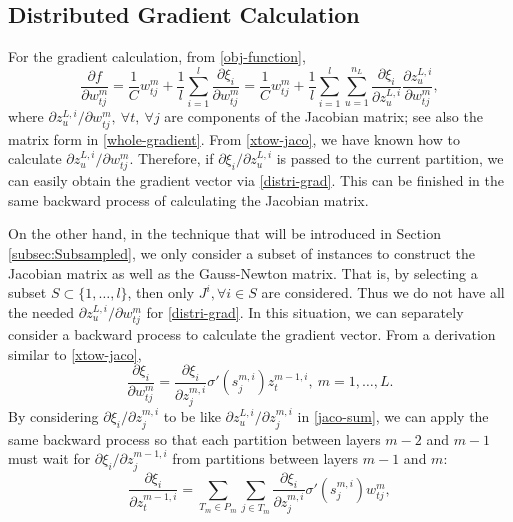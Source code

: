 \documentclass[12pt]{article}
\begin{document}
\subsection{Distributed Gradient Calculation}
\label{subsec:distri-gradient}
For the gradient calculation, from \eqref{obj-function}, 
\begin{equation}
\label{distri-grad}
\frac{\partial f}{\partial w^m_{tj}}
=\frac{1}{C} w^m_{tj} + \frac{1}{l} \sum_{i=1}^l \frac{\partial \xi_i}{\partial w^m_{tj}}
=\frac{1}{C} w^m_{tj} + \frac{1}{l} \sum_{i=1}^l \sum_{u=1}^{n_L} \frac{\partial \xi_i}{\partial z^{L,i}_u} \frac{\partial z^{L,i}_u}{\partial w^m_{tj}},
\end{equation}
where $\partial z^{L,i}_u/\partial w^m_{tj},\ \forall t,\ \forall j$ are components of the Jacobian matrix; see also the matrix form in \eqref{whole-gradient}.
From \eqref{xtow-jaco}, we have known how to calculate $\partial z^{L,i}_u/\partial w^m_{tj}$. Therefore, if $\partial \xi_i / \partial z^{L,i}_u$ is passed
to the current partition, we can easily obtain the gradient vector via \eqref{distri-grad}. This can be finished in the same backward process of calculating the Jacobian matrix.
\par On the other hand, in the technique that will be introduced in Section \ref{subsec:Subsampled}, we only consider a subset of instances to construct the Jacobian matrix as well as
the Gauss-Newton matrix. That is, by selecting a subset $S \subset \{1, \ldots,l\}$, then only $J^i, \forall i \in S$ are considered. 
Thus we do not have all the needed $\partial z^{L,i}_u/\partial w^m_{tj}$ for \eqref{distri-grad}. 
In this situation, we can separately consider a backward process to calculate the gradient vector.
From a derivation similar to \eqref{xtow-jaco},
\begin{equation}
\label{nabla_w-cost}
\frac{\partial \xi_i}{\partial w^m_{tj}}=
\frac{\partial \xi_i}{\partial z^{m,i}_j} \sigma'(s^{m,i}_j) z^{m-1,i}_t,\ m = 1, \ldots,  L.
\end{equation}
By considering $\partial \xi_i/\partial z^{m,i}_j$ to be like $\partial z^{L,i}_u/\partial z^{m,i}_j$ in \eqref{jaco-sum}, we
can apply the same backward process so that each partition between layers $m-2$ and $m-1$ must wait for $\partial \xi_i/\partial z^{m-1,i}_j$ from partitions between layers $m-1$ and $m$:
\begin{equation}
\label{nabla_z-cost}
\frac{\partial \xi_i}{\partial z^{m-1,i}_t} =
\sum_{T_m \in P_m} \sum_{j \in T_m} \frac{\partial \xi_i}{\partial z^{m,i}_j} \sigma'(s^{m,i}_j) w^m_{tj},
\end{equation}
\end{document}
